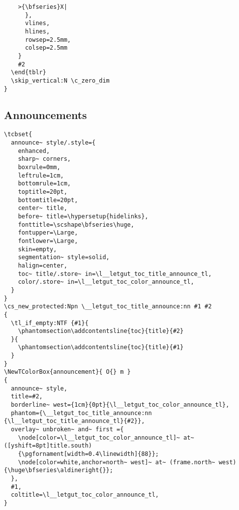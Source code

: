\documentclass{letgut}
\begin{document}
\begin{lstlisting}
	>{\bfseries}X|
      },
      vlines,
      hlines,
      rowsep=2.5mm,
      colsep=2.5mm
    }
    #2
  \end{tblr}
  \skip_vertical:N \c_zero_dim
}
\end{lstlisting}

\subsection{Announcements}
\label{ImplementationAnnounces-nahckb909pj0}
\begin{lstlisting}
\tcbset{
  announce~ style/.style={
    enhanced,
    sharp~ corners,
    boxrule=0mm,
    leftrule=1cm,
    bottomrule=1cm,
    toptitle=20pt,
    bottomtitle=20pt,
    center~ title,
    before~ title=\hypersetup{hidelinks},
    fonttitle=\scshape\bfseries\huge,
    fontupper=\Large,
    fontlower=\Large,
    skin=empty,
    segmentation~ style=solid,
    halign=center,
    toc~ title/.store~ in=\l__letgut_toc_title_announce_tl,
    color/.store~ in=\l__letgut_toc_color_announce_tl,
  }
}
\cs_new_protected:Npn \__letgut_toc_title_announce:nn #1 #2
{
  \tl_if_empty:NTF {#1}{
    \phantomsection\addcontentsline{toc}{title}{#2}
  }{
    \phantomsection\addcontentsline{toc}{title}{#1}
  }
}
\NewTColorBox{announcement}{ O{} m }
{
  announce~ style,
  title=#2,
  borderline~ west={1cm}{0pt}{\l__letgut_toc_color_announce_tl},
  phantom={\__letgut_toc_title_announce:nn {\l__letgut_toc_title_announce_tl}{#2}},
  overlay~ unbroken~ and~ first ={
    \node[color=\l__letgut_toc_color_announce_tl]~ at~ ([yshift=8pt]title.south)
    {\pgfornament[width=0.4\linewidth]{88}};
    \node[color=white,anchor=north~ west]~ at~ (frame.north~ west) {\huge\bfseries\aldineright{}};
  },
  #1,
  coltitle=\l__letgut_toc_color_announce_tl,
}
\end{lstlisting}
\end{document}
